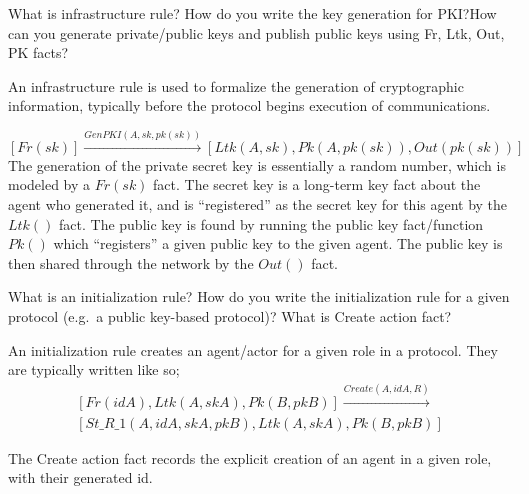 \begin{questions}
\question{} What is infrastructure rule? How do you write the key generation for PKI?\@ How can you generate private/public keys and publish public keys using Fr, Ltk, Out, PK facts?
  \begin{solution}
    An infrastructure rule is used to formalize the generation of cryptographic information, typically before the protocol begins execution of communications.

    \begin{equation}\label{eq:PKI_Infrastructure_Rule}
      [Fr(sk)] \overset{GenPKI(A, sk, pk(sk))}{\longrightarrow} [Ltk(A, sk), Pk(A, pk(sk)), Out(pk(sk))]
    \end{equation}
    The generation of the private secret key is essentially a random number, which is modeled by a $Fr(sk)$ fact.
    The secret key is a long-term key fact about the agent who generated it, and is ``registered'' as the secret key for this agent by the $Ltk()$ fact.
    The public key is found by running the public key fact/function $Pk()$ which ``registers'' a given public key to the given agent.
    The public key is then shared through the network by the $Out()$ fact.
  \end{solution}

\question{} What is an initialization rule? How do you write the initialization rule for a given protocol (e.g.\ a public key-based protocol)? What is Create action fact?
  \begin{solution}
    An initialization rule creates an agent/actor for a given role in a protocol.
    They are typically written like so;
    \begin{multline}\label{eq:Initialization_Rule}
      [Fr(idA), Ltk(A, skA), Pk(B, pkB)] \overset{Create(A, idA, R)}{\longrightarrow} \\ [St\_R\_1(A, idA, skA, pkB), Ltk(A, skA), Pk(B, pkB)]
    \end{multline}

    The Create action fact records the explicit creation of an agent in a given role, with their generated id.
  \end{solution}


\end{questions}
